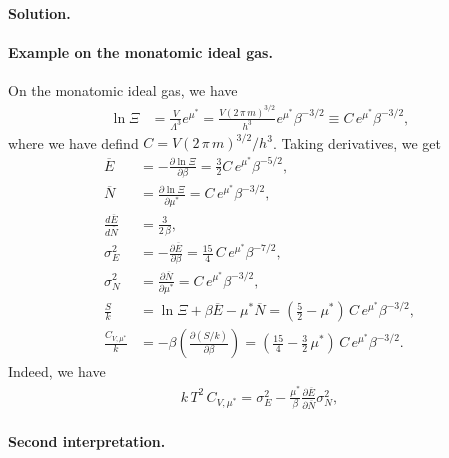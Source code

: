 \documentclass[twocolumn, 10pt]{article}
\numberwithin{equation}{section}
\newenvironment{solution}
{\par\medskip
  \textbf{Solution. }\ignorespaces}
{\medskip}
\begin{document}
\begin{solution}
\paragraph*{Example on the monatomic ideal gas.}

On the monatomic ideal gas, we have
\begin{align*}
  \ln \Xi
  &= \frac{ V } { \Lambda^3 } e^{\mu^*}
  = \frac{ V (2 \, \pi \, m)^{3/2}} { h^3 } e^{\mu^*} \beta^{-3/2}
  \equiv C \, e^{\mu^*} \beta^{-3/2}
  ,
\end{align*}
where we have defind $C = V (2 \, \pi \, m)^{3/2}/h^3$.
%
Taking derivatives, we get
\begin{align*}
  \overline{ E }
  &= - \frac{ \partial \ln \Xi } { \partial \beta }
  = \frac{3}{2} C \, e^{\mu^*} \beta^{-5/2}
  ,
  \\
  \overline{ N }
  &= \frac{ \partial \ln \Xi } { \partial \mu^* }
  = C \, e^{\mu^*} \beta^{-3/2}
  ,
  \\
  \frac{ d\overline E } { d\overline N}
  &=
  \frac{3}{2\,\beta}
  ,
  \\
  \sigma_E^2
  &= - \frac{ \partial \overline{E} } { \partial \beta }
  = \frac{15}{4} \, C \, e^{\mu^*} \beta^{-7/2}
  ,
  \\
  \sigma_N^2
  &= \frac{ \partial \overline{N} } { \partial \mu^* }
  = C \, e^{\mu^*} \beta^{-3/2}
  ,
  \\
  \frac{S}{k}
  &=
  \ln \Xi + \beta \overline{E}
  -\mu^* \overline{N}
  =
  \left(\frac{5}{2} - \mu^* \right) \, C \, e^{\mu^*} \beta^{-3/2}
  ,
  \\
  \frac{C_{V, \mu^*}}{k}
  &= -\beta \left( \frac{\partial (S/k) } {\partial \beta} \right)
  = \left(\frac{15}{4} - \frac{3}{2} \, \mu^* \right)
    \, C \, e^{\mu^*} \beta^{-3/2}
  .
\end{align*}
Indeed, we have
\begin{align}
  k \, T^2 \, C_{V, \mu^*}
  =
  \sigma_E^2
  - \frac{\mu^*}{\beta} \frac{ \partial \overline E } { \partial \overline N} \sigma_N^2
  ,
\end{align}



\paragraph*{Second interpretation.}


\end{solution}
\end{document}
